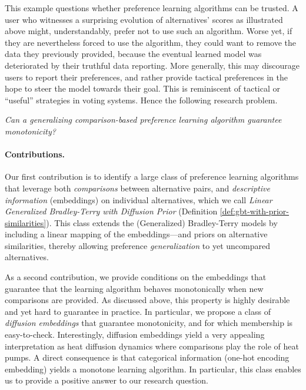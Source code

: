 \documentclass{article}
\begin{document}
This example questions whether preference learning algorithms can be trusted.
A user who witnesses a surprising evolution of alternatives' scores as illustrated above might, understandably, prefer not to use such an algorithm.
Worse yet, if they are nevertheless forced to use the algorithm, they could want to remove the data they previously provided, because the eventual learned model was deteriorated by their truthful data reporting.
More generally, this may discourage users to report their preferences, and rather provide tactical preferences in the hope to steer the model towards their goal.
This is reminiscent of tactical or ``useful'' strategies in voting systems.
Hence the following research problem.
\begin{center}
    \emph{Can a generalizing comparison-based preference learning algorithm guarantee monotonicity?}
\end{center}

\paragraph{Contributions.}
Our first contribution is to identify 
a large class of preference learning algorithms that leverage both \emph{comparisons} between alternative pairs, and \emph{descriptive information} (embeddings) on individual alternatives,
which we call \emph{Linear Generalized Bradley-Terry with Diffusion Prior} (Definition \ref{def:gbt-with-prior-similarities}).
This class extends the (Generalized) Bradley-Terry models \cite{DBLP:conf/aaai/FageotFHV24}
by including a linear mapping of the embeddings---and priors on alternative similarities,
thereby allowing preference \emph{generalization} to yet uncompared alternatives.

As a second contribution, we provide conditions on the embeddings that guarantee that the learning algorithm behaves monotonically when new comparisons are provided.
As discussed above, this property is highly desirable and yet hard to guarantee in practice.
In particular, we propose a class of \emph{diffusion embeddings} that guarantee monotonicity, and for which membership is easy-to-check.
Interestingly, diffusion embeddings yield a very appealing interpretation as heat diffusion dynamics where comparisons play the role of heat pumps.
A direct consequence is that categorical information (one-hot encoding embedding)
yields a monotone learning algorithm.
In particular, this class enables us to provide a positive answer
to our research question.
\end{document}
